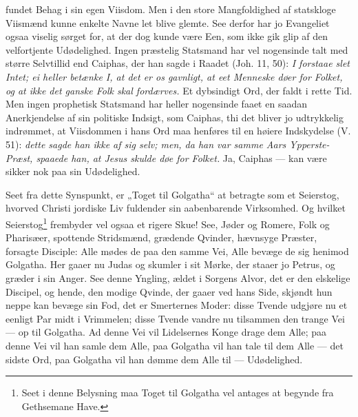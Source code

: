 \documentclass[12pt,a4paper]{book}
\begin{document}
fundet Behag i sin egen Viisdom. Men i den store Mangfoldighed af statskloge Viismænd
kunne enkelte Navne let blive glemte. See derfor har jo Evangeliet ogsaa viselig sørget
for, at der dog kunde være Een, som ikke gik glip af den velfortjente Udødelighed. Ingen
præstelig Statsmand har vel nogensinde talt med større Selvtillid end Caiphas, der han
sagde i Raadet (Joh. 11, 50): \emph{I forstaae slet Intet; ei heller betænke I, at det
er os gavnligt, at eet Menneske døer for Folket, og at ikke det ganske Folk skal
fordærves.} Et dybsindigt Ord, der faldt i rette Tid. Men ingen prophetisk Statsmand har
heller nogensinde faaet en saadan Anerkjendelse af sin politiske Indsigt, som Caiphas,
thi det bliver jo udtrykkelig indrømmet, at Viisdommen i hans Ord maa henføres til en
høiere Indskydelse (V. 51): \emph{dette sagde han ikke af sig selv; men, da han var
samme Aars Ypperste-Præst, spaaede han, at Jesus skulde døe for Folket.} Ja, Caiphas ---
kan være sikker nok paa sin Udødelighed.

Seet fra dette Synspunkt, er „Toget til Golgatha“ at betragte som et Seierstog, hvorved
Christi jordiske Liv fuldender sin aabenbarende Virksomhed. Og hvilket Seierstog\footnote{Seet
i denne Belysning maa Toget til Golgatha vel antages at begynde fra Gethsemane Have.}
frembyder vel
ogsaa et rigere Skue! See, Jøder og Romere, Folk og Pharisæer, spottende Stridsmænd,
grædende Qvinder, hævnsyge Præster, forsagte Disciple: Alle mødes de paa den samme Vei,
Alle bevæge de sig henimod Golgatha. Her gaaer nu Judas og skumler i sit Mørke, der
staaer jo Petrus, og græder i sin Anger. See denne Yngling, ældet i Sorgens Alvor, det
er den elskelige Discipel, og hende, den modige Qvinde, der gaaer ved hans Side, skjøndt
hun neppe kan bevæge sin Fod, det er Smerternes Moder: disse Tvende udgjøre nu et eenligt
Par midt i Vrimmelen; disse Tvende vandre nu tilsammen den trange Vei --- op til
Golgatha. Ad denne Vei vil Lidelsernes Konge drage dem Alle; paa denne Vei vil han samle
dem Alle, paa Golgatha vil han tale til dem Alle --- det sidste Ord, paa Golgatha vil
han dømme dem Alle til --- Udødelighed.
\end{document}
